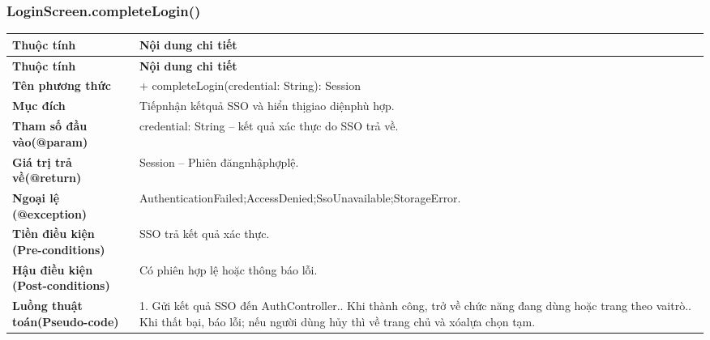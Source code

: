 \subsubsection{LoginScreen.completeLogin()}
\begin{longtable}{|L{0.24\textwidth}|L{0.70\textwidth}|}
\hline
\textbf{Thuộc tính} & \textbf{Nội dung chi tiết} \\
\hline
\endfirsthead
\hline
\textbf{Thuộc tính} & \textbf{Nội dung chi tiết} \\
\hline
\endhead
\textbf{Tên phương thức} & + completeLogin(credential: String): Session \\
\hline
\textbf{Mục đích} & Tiếpnhận kếtquả SSO và hiển thịgiao diệnphù hợp. \\
\hline
\textbf{Tham số đầu vào}\newline \textbf{(@param)} & credential: String – kết quả xác thực do SSO trả về. \\
\hline
\textbf{Giá trị trả về(@return)} & Session – Phiên đăngnhậphợplệ. \\
\hline
\textbf{Ngoại lệ (@exception)} & AuthenticationFailed;\newline AccessDenied;\newline SsoUnavailable;\newline StorageError. \\
\hline
\textbf{Tiền điều kiện (Pre-}\newline \textbf{conditions)} & SSO trả kết quả xác thực. \\
\hline
\textbf{Hậu điều kiện (Post-}\newline \textbf{conditions)} & Có phiên hợp lệ hoặc thông báo lỗi. \\
\hline
\textbf{Luồng thuật toán}\newline \textbf{(Pseudo-code)} & 1. Gửi kết quả SSO đến AuthController.. Khi thành công, trở về chức năng đang dùng hoặc trang theo vai\newline trò.. Khi thất bại, báo lỗi; nếu người dùng hủy thì về trang chủ và xóa\newline lựa chọn tạm. \\
\hline
\end{longtable}
\vspace{-0.5\baselineskip}
